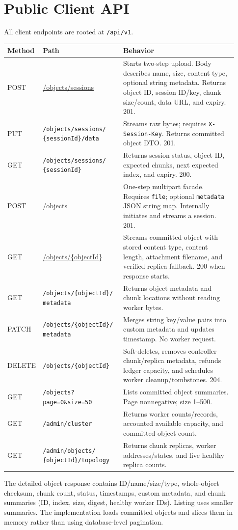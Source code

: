 \documentclass[11pt,a4paper]{article}
\begin{document}
\section{Public Client API}
All client endpoints are rooted at \texttt{/api/v1}.
\begin{longtable}{p{0.08\linewidth}p{0.35\linewidth}p{0.50\linewidth}}
\toprule \textbf{Method} & \textbf{Path} & \textbf{Behavior}\\ \midrule
\endhead
POST & \url{/objects/sessions} & Starts two-step upload. Body describes name, size, content type, optional string metadata. Returns object ID, session ID/key, chunk size/count, data URL, and expiry. 201.\\
PUT & \makecell[l]{\texttt{/objects/sessions/}\\\texttt{\{sessionId\}/data}} & Streams raw bytes; requires \texttt{X-Session-Key}. Returns committed object DTO. 201.\\
GET & \makecell[l]{\texttt{/objects/sessions/}\\\texttt{\{sessionId\}}} & Returns session status, object ID, expected chunks, next expected index, and expiry. 200.\\
POST & \url{/objects} & One-step multipart facade. Requires \texttt{file}; optional \texttt{metadata} JSON string map. Internally initiates and streams a session. 201.\\
GET & \url{/objects/\{objectId\}} & Streams committed object with stored content type, content length, attachment filename, and verified replica fallback. 200 when response starts.\\
GET & \makecell[l]{\texttt{/objects/\{objectId\}/}\\\texttt{metadata}} & Returns object metadata and chunk locations without reading worker bytes.\\
PATCH & \makecell[l]{\texttt{/objects/\{objectId\}/}\\\texttt{metadata}} & Merges string key/value pairs into custom metadata and updates timestamp. No worker request.\\
DELETE & \texttt{/objects/\{objectId\}} & Soft-deletes, removes controller chunk/replica metadata, refunds ledger capacity, and schedules worker cleanup/tombstones. 204.\\
GET & \texttt{/objects?page=0\&size=50} & Lists committed object summaries. Page nonnegative; size 1--500.\\
GET & \texttt{/admin/cluster} & Returns worker counts/records, accounted available capacity, and committed object count.\\
GET & \makecell[l]{\texttt{/admin/objects/}\\\texttt{\{objectId\}/topology}} & Returns chunk replicas, worker addresses/states, and live healthy replica counts.\\
\bottomrule
\end{longtable}
The detailed object response contains ID/name/size/type, whole-object checksum, chunk count, status, timestamps, custom metadata, and chunk summaries (ID, index, size, digest, healthy worker IDs). Listing uses smaller summaries. The implementation loads committed objects and slices them in memory rather than using database-level pagination.
\end{document}

